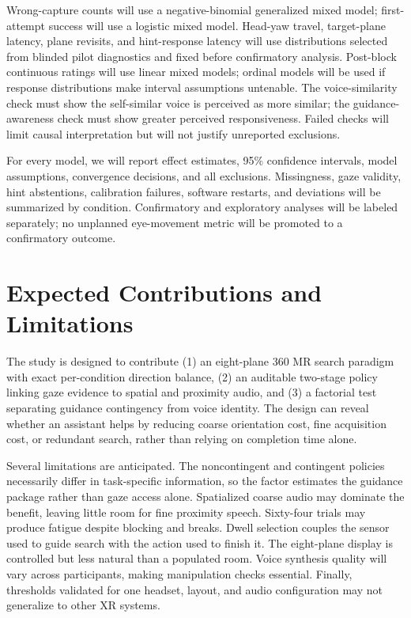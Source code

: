 \documentclass[10pt,journal,compsoc]{IEEEtran}
\begin{document}
Wrong-capture counts will use a negative-binomial generalized mixed model; first-attempt success will use a logistic mixed model. Head-yaw travel, target-plane latency, plane revisits, and hint-response latency will use distributions selected from blinded pilot diagnostics and fixed before confirmatory analysis. Post-block continuous ratings will use linear mixed models; ordinal models will be used if response distributions make interval assumptions untenable. The voice-similarity check must show the self-similar voice is perceived as more similar; the guidance-awareness check must show greater perceived responsiveness. Failed checks will limit causal interpretation but will not justify unreported exclusions.

For every model, we will report effect estimates, 95\% confidence intervals, model assumptions, convergence decisions, and all exclusions. Missingness, gaze validity, hint abstentions, calibration failures, software restarts, and deviations will be summarized by condition. Confirmatory and exploratory analyses will be labeled separately; no unplanned eye-movement metric will be promoted to a confirmatory outcome.

\section{Expected Contributions and Limitations}
The study is designed to contribute (1) an eight-plane 360\textdegree{} MR search paradigm with exact per-condition direction balance, (2) an auditable two-stage policy linking gaze evidence to spatial and proximity audio, and (3) a factorial test separating guidance contingency from voice identity. The design can reveal whether an assistant helps by reducing coarse orientation cost, fine acquisition cost, or redundant search, rather than relying on completion time alone.

Several limitations are anticipated. The noncontingent and contingent policies necessarily differ in task-specific information, so the factor estimates the guidance package rather than gaze access alone. Spatialized coarse audio may dominate the benefit, leaving little room for fine proximity speech. Sixty-four trials may produce fatigue despite blocking and breaks. Dwell selection couples the sensor used to guide search with the action used to finish it. The eight-plane display is controlled but less natural than a populated room. Voice synthesis quality will vary across participants, making manipulation checks essential. Finally, thresholds validated for one headset, layout, and audio configuration may not generalize to other XR systems.
\end{document}
